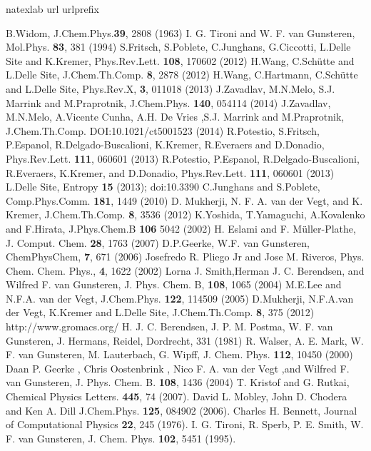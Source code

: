 \documentclass[a4paper,preprint,unsortedaddress]{revtex4-1}
\begin{document}
\begin{thebibliography}{24}
\expandafter\ifx\csname natexlab\endcsname\relax\def\natexlab#1{#1}\fi
\expandafter\ifx\csname url\endcsname\relax
  \def\url#1{\texttt{#1}}\fi
\expandafter\ifx\csname urlprefix\endcsname\relax\def\urlprefix{URL }\fi

B.Widom, J.Chem.Phys.{\bf 39}, 2808 (1963)
I. G. Tironi and W. F. van Gunsteren, Mol.Phys. {\bf 83}, 381 (1994)
S.Fritsch, S.Poblete, C.Junghans, G.Ciccotti, L.Delle Site and K.Kremer, Phys.Rev.Lett. {\bf 108}, 170602 (2012)
H.Wang, C.Sch\"{u}tte and L.Delle Site, J.Chem.Th.Comp. {\bf 8}, 2878 (2012)
H.Wang, C.Hartmann, C.Sch\"{u}tte and L.Delle Site, Phys.Rev.X, {\bf 3}, 011018 (2013)
J.Zavadlav, M.N.Melo, S.J. Marrink and M.Praprotnik, J.Chem.Phys. {\bf 140}, 054114 (2014)
J.Zavadlav, M.N.Melo, A.Vicente Cunha, A.H. De Vries ,S.J. Marrink and M.Praprotnik, J.Chem.Th.Comp. DOI:10.1021/ct5001523 (2014)
R.Potestio, S.Fritsch, P.Espanol, R.Delgado-Buscalioni, K.Kremer, R.Everaers and D.Donadio, Phys.Rev.Lett. {\bf 111}, 060601 (2013)
R.Potestio, P.Espanol, R.Delgado-Buscalioni, R.Everaers, K.Kremer, and D.Donadio, Phys.Rev.Lett. {\bf 111}, 060601 (2013)
L.Delle Site, Entropy {\bf 15} (2013); doi:10.3390
C.Junghans and S.Poblete, Comp.Phys.Comm. {\bf 181}, 1449 (2010)
D. Mukherji, N. F. A. van der Vegt, and K. Kremer, J.Chem.Th.Comp. {\bf 8}, 3536 (2012)
K.Yoshida, T.Yamaguchi, A.Kovalenko and F.Hirata, J.Phys.Chem.B {\bf 106} 5042 (2002)
H. Eslami and F. M\"{u}ller-Plathe, J. Comput. Chem. {\bf 28}, 1763 (2007)
D.P.Geerke, W.F. van Gunsteren, ChemPhysChem, {\bf 7}, 671 (2006)
Josefredo R. Pliego Jr and Jose  M. Riveros, Phys. Chem. Chem. Phys., {\bf 4}, 1622 (2002)
Lorna J. Smith,Herman J. C. Berendsen, and Wilfred F. van Gunsteren, J. Phys. Chem. B, {\bf 108}, 1065 (2004)
M.E.Lee and N.F.A. van der Vegt, J.Chem.Phys. {\bf 122}, 114509 (2005)
D.Mukherji, N.F.A.van der Vegt, K.Kremer and L.Delle Site, J.Chem.Th.Comp. {\bf 8}, 375 (2012)
http://www.gromacs.org/
H. J. C. Berendsen, J. P. M. Postma, W. F. van Gunsteren, J. Hermans, Reidel, Dordrecht, 331 (1981)
R. Walser, A. E. Mark, W. F. van Gunsteren, M. Lauterbach, G. Wipff, J. Chem. Phys. {\bf 112}, 10450 (2000)
Daan P. Geerke , Chris Oostenbrink , Nico F. A. van der Vegt ,and Wilfred F. van Gunsteren, J. Phys. Chem. B. {\bf 108}, 1436 (2004)
T. Kristof and G. Rutkai, Chemical Physics Letters. {\bf 445}, 74 (2007). 
David L. Mobley, John D. Chodera and Ken A. Dill  J.Chem.Phys. {\bf 125}, 084902 (2006).
Charles H. Bennett, Journal of Computational Physics {\bf 22}, 245 (1976).
I. G. Tironi, R. Sperb, P. E. Smith, W. F. van Gunsteren, J. Chem. Phys. {\bf 102}, 5451 (1995).
\end{thebibliography}
\end{document}
